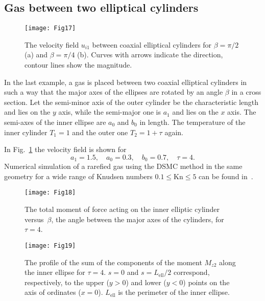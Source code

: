 \documentclass[smallextended, final]{svjour3} %
\newcommand{\Kn}{\mathrm{Kn}}
\begin{document}
\subsection{Gas between two elliptical cylinders}

\begin{figure}
    \centering
    \texttt{[image: Fig17]}
    \caption{The velocity field \(u_{i1}\) between coaxial elliptical cylinders
            for \(\beta = \pi/2\) (a) and \(\beta = \pi/4\) (b).
        Curves with arrows indicate the direction, contour lines show the magnitude.}
    \label{fig:elliptic}
\end{figure}

In the last example, a gas is placed between two coaxial elliptical cylinders
in such a way that the major axes of the ellipses are rotated by an angle \(\beta\) in a cross section.
Let the semi-minor axis of the outer cylinder be the characteristic length and lies on the \(y\) axis,
while the semi-major one is \(a_1\) and lies on the \(x\) axis.
The semi-axes of the inner ellipse are \(a_0\) and \(b_0\) in length.
The temperature of the inner cylinder \(T_1 = 1\) and the outer one \(T_2 = 1+\tau\) again.

In Fig.~\ref{fig:elliptic} the velocity field is shown for
\[ a_1 = 1.5, \quad a_0 = 0.3, \quad b_0 = 0.7, \quad \tau = 4. \]
Numerical simulation of a rarefied gas using the DSMC method in the same geometry
for a wide range of Knudsen numbers \(0.1\le\Kn\le5\) can be found in~\cite{SoneCoaxial}.

\begin{figure}[ht]
    \centering
    \begin{minipage}{.48\textwidth}
        \centering
        \texttt{[image: Fig18]}
        \caption{The total moment of force acting on the inner elliptic cylinder
                versus~\(\beta\), the angle between the major axes of the cylinders,
                for \(\tau=4\).}
        \label{fig:elliptic:beta}
    \end{minipage}
    \quad
    \begin{minipage}{.48\textwidth}
        \centering
        \texttt{[image: Fig19]}
        \caption{The profile of the sum of the components of the moment \(M_{z2}\)
                along the inner ellipse for \(\tau=4\).
                \(s=0\) and \(s=L_\mathrm{ell}/2\) correspond, respectively,
                to the upper (\(y>0\)) and lower (\(y<0\)) points on the axis of ordinates (\(x=0\)).
                \(L_\mathrm{ell}\) is the perimeter of the inner ellipse.}
        \label{fig:elliptic:profiles}
    \end{minipage}
\end{figure}
\end{document}
